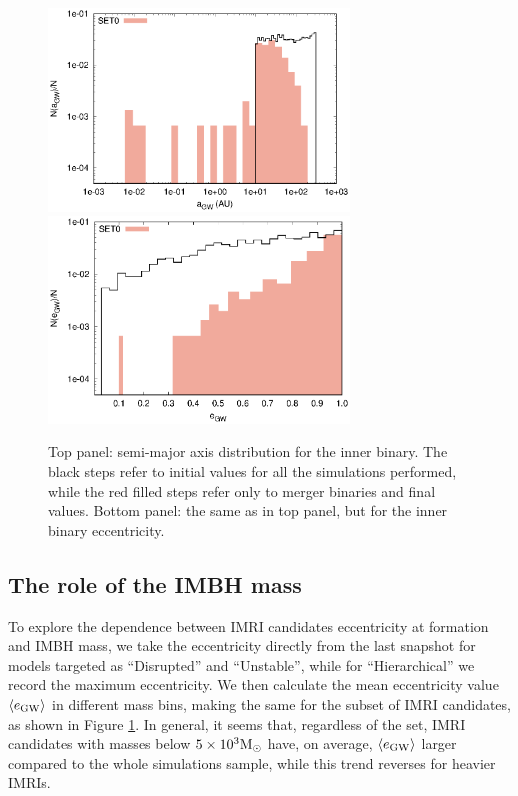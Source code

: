 \documentclass[twocolumn]{aastex62}
\newcommand{\Ms}{{\rm M}_\odot}
\newcommand{\gw}{{\rm GW}}
\begin{document}
\begin{figure}
\centering
\includegraphics[width=8cm]{semiaxis}\\
\includegraphics[width=8cm]{ecce}
\caption{Top panel: semi-major axis distribution for the inner binary. The black steps refer to initial values for all the simulations performed, while the red filled steps refer only to merger binaries and final values. Bottom panel: the same as in top panel, but for the inner binary eccentricity.}
\label{fig:f4}
\end{figure}

\subsection{The role of the IMBH mass}

To explore the dependence between IMRI candidates eccentricity at formation and IMBH mass, we take the eccentricity directly from the last snapshot for models targeted as ``Disrupted'' and ``Unstable'', while for ``Hierarchical'' we record the maximum eccentricity. We then calculate the mean eccentricity value $\langle e_\gw\rangle$  in different mass bins, making the same for the subset of IMRI candidates, as shown in Figure \ref{fig:f4}. In general, it seems that, regardless of the set, IMRI candidates with masses below $5\times10^3\Ms$ have, on average, $\langle e_\gw\rangle$ larger compared to the whole simulations sample, while this trend reverses for heavier IMRIs. 
\end{document}
